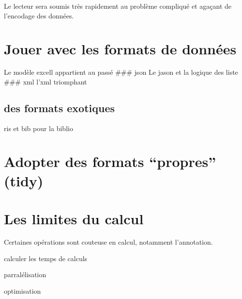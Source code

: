 \documentclass[
]{book}
\begin{document}
Le lecteur sera soumis très rapidement au problème compliqué et agaçant de l'encodage des données.

\hypertarget{jouer-avec-les-formats-de-donnuxe9es}{%
\section{Jouer avec les formats de données}\label{jouer-avec-les-formats-de-donnuxe9es}}

Le modèle excell appartient au passé
\#\#\# json
Le jason et la logique des liste
\#\#\# xml
l'xml triomphant

\hypertarget{des-formats-exotiques}{%
\subsection{des formats exotiques}\label{des-formats-exotiques}}

ris et bib pour la biblio

\hypertarget{adopter-des-formats-propres-tidy}{%
\section{Adopter des formats ``propres'' (tidy)}\label{adopter-des-formats-propres-tidy}}

\hypertarget{les-limites-du-calcul}{%
\section{Les limites du calcul}\label{les-limites-du-calcul}}

Certaines opérations sont couteuse en calcul, notamment l'annotation.

calculer les temps de calculs

parralélisation

optimisation

  
\end{document}
